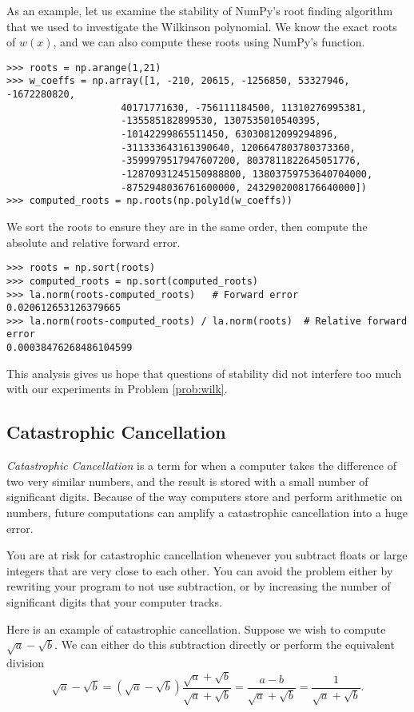 As an example, let us examine the stability of NumPy's root finding algorithm that we used to investigate the Wilkinson polynomial.
We know the exact roots of $w(x)$, and we can also compute these roots using NumPy's  function.
\begin{lstlisting}
>>> roots = np.arange(1,21)
>>> w_coeffs = np.array([1, -210, 20615, -1256850, 53327946, -1672280820,
                    40171771630, -756111184500, 11310276995381,
                    -135585182899530, 1307535010540395,
                    -10142299865511450, 63030812099294896,
                    -311333643161390640, 1206647803780373360,
                    -3599979517947607200, 8037811822645051776,
                    -12870931245150988800, 13803759753640704000,
                    -8752948036761600000, 2432902008176640000])
>>> computed_roots = np.roots(np.poly1d(w_coeffs))
\end{lstlisting}
We sort the roots to ensure they are in the same order, then compute the absolute and relative forward error.
\begin{lstlisting}
>>> roots = np.sort(roots)
>>> computed_roots = np.sort(computed_roots)
>>> la.norm(roots-computed_roots)	# Forward error
0.020612653126379665
>>> la.norm(roots-computed_roots) / la.norm(roots)	# Relative forward error
0.00038476268486104599
\end{lstlisting}

This analysis gives us hope that questions of stability did not interfere too much with our experiments in Problem \ref{prob:wilk}.

\subsection*{Catastrophic Cancellation}
\emph{Catastrophic Cancellation} is a term for when a computer takes the difference of two very similar numbers, and the result is stored with a small number of significant digits.
Because of the way computers store and perform arithmetic on numbers, future computations can amplify a catastrophic cancellation into a huge error.

You are at risk for catastrophic cancellation whenever you subtract floats or large integers that are very close to each other.
You can avoid the problem either by rewriting your program to not use subtraction, or by increasing the number of significant digits that your computer tracks.

Here is an example of catastrophic cancellation.
Suppose we wish to compute $\sqrt{a}-\sqrt{b}$. We can either do this subtraction directly or perform the equivalent division
\[
\sqrt{a}-\sqrt{b} = (\sqrt{a}-\sqrt{b})\frac{\sqrt{a}+\sqrt{b}}{\sqrt{a}+\sqrt{b}} = \frac{a-b}{\sqrt{a}+\sqrt{b}}=\frac{1}{\sqrt{a}+\sqrt{b}}.
\]

